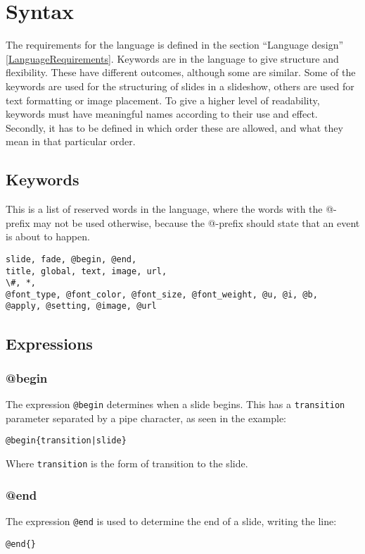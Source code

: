 \chapter{Syntax}
\label{SSyntax}

The requirements for the language is defined in the section ``Language design'' \ref{LanguageRequirements}. Keywords are in the language to give structure and flexibility. These have different outcomes, although some are similar. Some of the keywords are used for the structuring of slides in a slideshow, others are used for text formatting or image placement. To give a higher level of readability, keywords must have meaningful names according to their use and effect. Secondly, it has to be defined in which order these are allowed, and what they mean in that particular order.

\section{Keywords}
This is a list of reserved words in the language, where the words with the @-prefix may not be used otherwise, because the @-prefix should state that an event is about to happen.

\begin{lstlisting}[frame=single]
slide, fade, @begin, @end, 
title, global, text, image, url,  
\#, *, 
@font_type, @font_color, @font_size, @font_weight, @u, @i, @b, 
@apply, @setting, @image, @url
\end{lstlisting}

\section{Expressions}

\subsection{@begin}
\label{@begin}
The expression \texttt{@begin} determines when a slide begins. This has a \texttt{transition} parameter separated by a pipe character, as seen in the example:
\begin{lstlisting}[frame=single]
@begin{transition|slide}
\end{lstlisting}
Where \texttt{transition} is the form of transition to the slide. 

\subsection{@end}
\label{@end}
The expression \texttt{@end} is used to determine the end of a slide, writing the line: 
\begin{lstlisting}[frame=single]
@end{}
\end{lstlisting}

